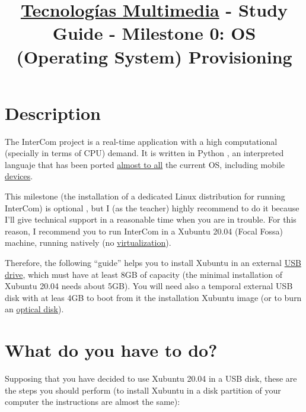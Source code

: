 \title{\href{https://www.ual.es/estudios/grados/presentacion/plandeestudios/asignatura/4015/40154321?idioma=zh_CN}{Tecnologías Multimedia} - Study Guide - Milestone 0: OS (Operating System) Provisioning}

\maketitle

\section{Description}

The InterCom project \cite{intercom} is a real-time application with
a high computational (specially in terms of CPU) demand. It is written
in Python \cite{Python}, an interpreted languaje that has been
ported \href{https://www.python.org/download/other/}{almost to all}
the current OS, including
mobile \href{https://kivy.org/#home}{devices}.

This milestone (the installation of a dedicated Linux distribution for
running InterCom) is optional , but I (as the teacher) highly
recommend to do it because I'll give technical support in a reasonable
time when you are in trouble. For this reason, I recommend you to run
InterCom in a Xubuntu 20.04 (Focal Fossa) \cite{xubuntu} machine,
running natively
(no \href{https://en.wikipedia.org/wiki/Virtualization}{virtualization}).

Therefore, the following ``guide'' helps you to install Xubuntu in an
external \href{https://en.wikipedia.org/wiki/USB_flash_drive}{USB
drive}, which must have at least 8GB of capacity (the minimal
installation of Xubuntu 20.04 needs about 5GB). You will need also a
temporal external USB disk with at leas 4GB to boot from it the
installation Xubuntu image (or to burn
an \href{https://en.wikipedia.org/wiki/Optical_disc}{optical disk}).

\section{What do you have to do?}

Supposing that you have decided to use Xubuntu 20.04 in a USB disk,
these are the steps you should perform (to install Xubuntu in a disk
partition of your computer the instructions are almost the same):


